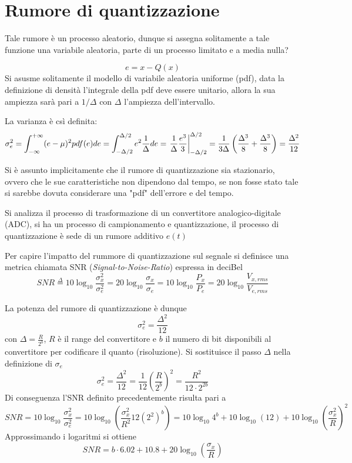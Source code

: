 
\section{Rumore di quantizzazione}
Tale rumore è un processo aleatorio, dunque si assegna solitamente a tale
funzione una variabile aleatoria, parte di un processo limitato e a media nulla?

$$
e = x - Q(x)
$$
Si asusme solitamente il modello di variabile aleatoria uniforme (pdf), data la
definizione di densità l'integrale della pdf deve essere unitario, allora la
sua ampiezza sarà pari a $1/\Delta$ con $\Delta$ l'ampiezza dell'intervallo.

La varianza è csì definita:
$$
\sigma^2_e = \int_{-\infty}^{+\infty} (e-\mu)^2 pdf(e) de = \int_{-\Delta/2}^{\Delta/2} e^2 \frac{1}{\Delta} de =\left. \frac{1}{\Delta} \frac{e^3}{3} \right|_{-\Delta/2}^{\Delta/2} = 
\frac{1}{3\Delta} \left(\frac{\Delta^3}{8}+\frac{\Delta^3}{8}\right) = 
\frac{\Delta^2}{12}
$$

Si è assunto implicitamente che il rumore di quantizzazione sia stazionario, 
ovvero che le sue caratteristiche non dipendono dal tempo, se non fosse stato 
tale si sarebbe dovuta considerare una "pdf" dell'errore e del tempo.

Si analizza il processo di trasformazione di un convertitore analogico-digitale 
(ADC), si ha un processo di campionamento e quantizzazione, il processo di 
quantizzazione è sede di un rumore additivo $e(t)$

Per capire l'impatto del rummore di quantizzazione sul segnale si definisce una
metrica chiamata SNR (\textit{Signal-to-Noise-Ratio}) espressa in deciBel
$$
SNR \stackrel{\Delta}{=} 10\log_{10}\frac{\sigma_x^2}{\sigma_e^2} = 
20\log_{10}\frac{\sigma_x}{\sigma_e} = 10\log_{10}\frac{P_x}{P_e} = 
20\log_{10}\frac{V_{x,rms}}{V_{e,rms}}
$$

La potenza del rumore di quantizzazione è dunque
$$
\sigma_e^2 = \frac{\Delta^2}{12}
$$
con $\Delta = \frac{R}{2^b}$, $R$ è il range del convertitore e $b$ il numero 
di bit disponibili al convertitore per codificare il quanto (risoluzione).
Si sostituisce il passo $\Delta$ nella definizione di $\sigma_e$
$$
\sigma_e^2 = \frac{\Delta^2}{12} = \frac{1}{12}\left(\frac{R}{2^b}\right)^2 = \frac{R^2}{12\cdot 2^{2b}}
$$
Di conseguenza l'SNR definito precedentemente risulta pari a
$$
SNR = 10\log_{10}\frac{\sigma_x^2}{\sigma_e^2} = 10\log_{10}\left(\frac{\sigma_x^2}{R^2}12(2^2)^b\right) = 10\log_{10} 4^b + 10\log_{10}(12) +
10\log_{10}\left(\frac{\sigma_x^2}{R}\right)^2
$$
Approssimando i logaritmi si ottiene
$$
SNR = b\cdot 6.02 + 10.8 + 20\log_{10}\left(\frac{\sigma_x}{R}\right)
$$


